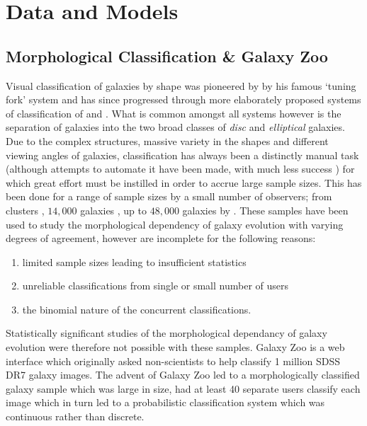 \documentclass{mn2e}
\begin{document}
\section{Data and Models}\label{data}

\subsection{Morphological Classification \& Galaxy Zoo}
Visual classification of galaxies by shape was pioneered by \citet{Hubble26} by his famous `tuning fork' system and has since progressed through more elaborately proposed systems of classification of \citet{deV59} and \citet{Sandage75}. What is common amongst all systems however is the separation of galaxies into the two broad classes of \emph{disc} and \emph{elliptical} galaxies. Due to the complex structures, massive variety in the shapes and different viewing angles of galaxies, classification has always been a distinctly manual task (although attempts to automate it have been made, with much less success \citealt{NA10}) for which great effort must be instilled in order to accrue large sample sizes. This has been done for a range of sample sizes by a small number of observers; from clusters \citep{}, $14,000$ galaxies \citep{NA10}, up to $48,000$ galaxies by \citep{Sch2007}. These samples have been used to study the morphological dependency of galaxy evolution with varying degrees of agreement, however are incomplete for the following reasons:
\begin{enumerate}
\item limited sample sizes leading to insufficient statistics
\item unreliable classifications from single or small number of users
\item the binomial nature of the concurrent classifications. 
\end{enumerate}

Statistically significant studies of the morphological dependancy of galaxy evolution were therefore not possible with these samples. Galaxy Zoo \citep{Lintott08} is a web interface which originally asked non-scientists to help classify 1 million SDSS DR7 galaxy images. The advent of Galaxy Zoo led to a morphologically classified galaxy sample which was large in size, had at least 40 separate users classify each image which in turn led to a probabilistic classification system which was continuous rather than discrete.
\end{document}
